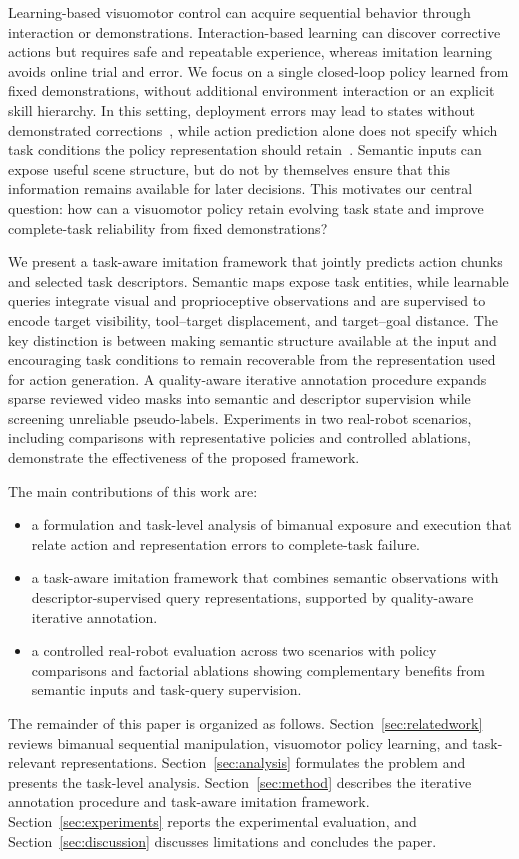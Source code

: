 Learning-based visuomotor control can acquire sequential behavior through interaction or demonstrations.
Interaction-based learning can discover corrective actions but requires safe and repeatable experience, whereas imitation learning avoids online trial and error.
We focus on a single closed-loop policy learned from fixed demonstrations, without additional environment interaction or an explicit skill hierarchy.
In this setting, deployment errors may lead to states without demonstrated corrections~\cite{ross2011,laskey2017dart}, while action prediction alone does not specify which task conditions the policy representation should retain~\cite{dehaan2019,wen2020copycat}.
Semantic inputs can expose useful scene structure, but do not by themselves ensure that this information remains available for later decisions.
This motivates our central question: how can a visuomotor policy retain evolving task state and improve complete-task reliability from fixed demonstrations?

We present a task-aware imitation framework that jointly predicts action chunks and selected task descriptors.
Semantic maps expose task entities, while learnable queries integrate visual and proprioceptive observations and are supervised to encode target visibility, tool--target displacement, and target--goal distance.
The key distinction is between making semantic structure available at the input and encouraging task conditions to remain recoverable from the representation used for action generation.
A quality-aware iterative annotation procedure expands sparse reviewed video masks into semantic and descriptor supervision while screening unreliable pseudo-labels.
Experiments in two real-robot scenarios, including comparisons with representative policies and controlled ablations, demonstrate the effectiveness of the proposed framework.

The main contributions of this work are:
\begin{itemize}
    \item a formulation and task-level analysis of bimanual exposure and execution that relate action and representation errors to complete-task failure.
    \item a task-aware imitation framework that combines semantic observations with descriptor-supervised query representations, supported by quality-aware iterative annotation.
    \item a controlled real-robot evaluation across two scenarios with policy comparisons and factorial ablations showing complementary benefits from semantic inputs and task-query supervision.
\end{itemize}

The remainder of this paper is organized as follows.
Section~\ref{sec:relatedwork} reviews bimanual sequential manipulation, visuomotor policy learning, and task-relevant representations.
Section~\ref{sec:analysis} formulates the problem and presents the task-level analysis.
Section~\ref{sec:method} describes the iterative annotation procedure and task-aware imitation framework.
Section~\ref{sec:experiments} reports the experimental evaluation, and Section~\ref{sec:discussion} discusses limitations and concludes the paper.
